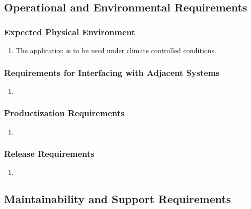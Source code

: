 \documentclass[]{article}
\begin{document}

\subsection{Operational and Environmental Requirements}
\label{sub:operational_and_environmental_requirements}

\subsubsection{Expected Physical Environment}
\label{ssub:expected_physical_environment}
\begin{enumerate}[{OE}1. ]
	\item The application is to be used under climate controlled conditions.
\end{enumerate}

\subsubsection{Requirements for Interfacing with Adjacent Systems}
\label{ssub:requirements_for_interfacing_with_adjacent_systems}
\begin{enumerate}[{OE}1. ]
	\item
\end{enumerate}

\subsubsection{Productization Requirements}
\label{ssub:productization_requirements}
\begin{enumerate}[{OE}1. ]
	\item
\end{enumerate}

\subsubsection{Release Requirements}
\label{ssub:release_requirements}
\begin{enumerate}[{OE}1. ]
	\item
\end{enumerate}


\subsection{Maintainability and Support Requirements}
\label{sub:maintainability_and_support_requirements}
\end{document}
